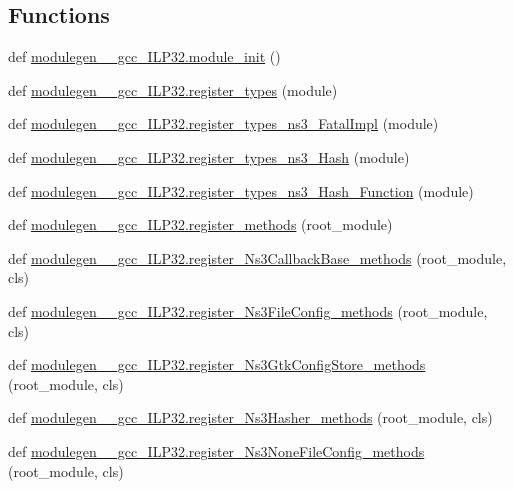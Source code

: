 \subsection*{Functions}
\begin{DoxyCompactItemize}
\item 
def \hyperlink{namespacemodulegen____gcc__ILP32_adeca9ed3c99593bd5eb3b0bd7981c321}{modulegen\+\_\+\+\_\+gcc\+\_\+\+I\+L\+P32.\+module\+\_\+init} ()
\item 
def \hyperlink{namespacemodulegen____gcc__ILP32_af565b2741bb1cd768d289459114389b9}{modulegen\+\_\+\+\_\+gcc\+\_\+\+I\+L\+P32.\+register\+\_\+types} (module)
\item 
def \hyperlink{namespacemodulegen____gcc__ILP32_aab873702fb2d41d9a78db27492ae87a5}{modulegen\+\_\+\+\_\+gcc\+\_\+\+I\+L\+P32.\+register\+\_\+types\+\_\+ns3\+\_\+\+Fatal\+Impl} (module)
\item 
def \hyperlink{namespacemodulegen____gcc__ILP32_a0bce51bcadf44c501181b3a56b927a40}{modulegen\+\_\+\+\_\+gcc\+\_\+\+I\+L\+P32.\+register\+\_\+types\+\_\+ns3\+\_\+\+Hash} (module)
\item 
def \hyperlink{namespacemodulegen____gcc__ILP32_af8a17079f3fe7bb312bb8a09266937fa}{modulegen\+\_\+\+\_\+gcc\+\_\+\+I\+L\+P32.\+register\+\_\+types\+\_\+ns3\+\_\+\+Hash\+\_\+\+Function} (module)
\item 
def \hyperlink{namespacemodulegen____gcc__ILP32_a94ccb7f04a4251f5353b68c8c69cb5fa}{modulegen\+\_\+\+\_\+gcc\+\_\+\+I\+L\+P32.\+register\+\_\+methods} (root\+\_\+module)
\item 
def \hyperlink{namespacemodulegen____gcc__ILP32_a0eba0aa92f0bdc57a46a1520487f32d1}{modulegen\+\_\+\+\_\+gcc\+\_\+\+I\+L\+P32.\+register\+\_\+\+Ns3\+Callback\+Base\+\_\+methods} (root\+\_\+module, cls)
\item 
def \hyperlink{namespacemodulegen____gcc__ILP32_a0662b77392e8a89c50fff89988db2def}{modulegen\+\_\+\+\_\+gcc\+\_\+\+I\+L\+P32.\+register\+\_\+\+Ns3\+File\+Config\+\_\+methods} (root\+\_\+module, cls)
\item 
def \hyperlink{namespacemodulegen____gcc__ILP32_a06d997032c249e5b98e07844e174b1a5}{modulegen\+\_\+\+\_\+gcc\+\_\+\+I\+L\+P32.\+register\+\_\+\+Ns3\+Gtk\+Config\+Store\+\_\+methods} (root\+\_\+module, cls)
\item 
def \hyperlink{namespacemodulegen____gcc__ILP32_a33425c5d69b8b6e93c725709f6aa95fb}{modulegen\+\_\+\+\_\+gcc\+\_\+\+I\+L\+P32.\+register\+\_\+\+Ns3\+Hasher\+\_\+methods} (root\+\_\+module, cls)
\item 
def \hyperlink{namespacemodulegen____gcc__ILP32_aaebfcb4c59017d8ce1d3775764be28cf}{modulegen\+\_\+\+\_\+gcc\+\_\+\+I\+L\+P32.\+register\+\_\+\+Ns3\+None\+File\+Config\+\_\+methods} (root\+\_\+module, cls)

\end{DoxyCompactItemize}
